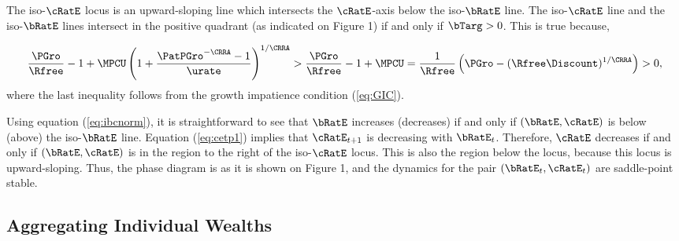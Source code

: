 \documentclass[titlepage]{\econtex}\newcommand{\texname}{cjSOE}
\begin{document}
The iso-$\cRatE$ locus is an upward-sloping line which intersects the $\cRatE$-axis below the iso-$\bRatE$ line. The iso-$\cRatE$ line and the iso-$\bRatE$ lines intersect in the positive quadrant (as indicated on Figure 1) if and only if $\bTarg > 0$. This is true because,

\begin{equation*}
\frac{\PGro}{\Rfree}-1+ \MPCU \left(1+\frac{\PatPGro^{-\CRRA}-1}{\urate}\right)^{1/\CRRA}
> \frac{\PGro}{\Rfree}-1+\MPCU = \frac{1}{\Rfree}\left(\PGro-(\Rfree \Discount)^{1/\CRRA}\right)>0,
\end{equation*}
where the last inequality follows from the growth impatience condition (\ref{eq:GIC}).

Using equation (\ref{eq:ibcnorm}), it is straightforward  to see that $\bRatE$ increases (decreases) if and only if $(\bRatE, \cRatE)$ is below (above) the iso-$\bRatE$ line. Equation (\ref{eq:cetp1}) implies that $\cRatE_{t+1}$ is decreasing with $\bRatE_t$. Therefore, $\cRatE$ decreases if and only if $(\bRatE, \cRatE)$ is in the region to the right of the iso-$\cRatE$ locus. This is also the region below the locus, because this locus is upward-sloping. Thus, the phase diagram is as it is shown on Figure 1, and the dynamics for the pair $(\bRatE _t, \cRatE_t)$ are saddle-point stable.


\subsection{Aggregating Individual Wealths}
\end{document}

